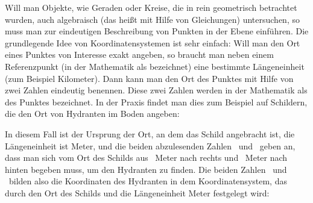 
\Mtikzexternalize




\begin{MSectionStart}

\MModstartBox
\end{MSectionStart}


\begin{MIntro}

Will man Objekte, wie Geraden oder Kreise, die in  rein geometrisch betrachtet wurden, auch algebraisch (das heißt mit Hilfe von Gleichungen) untersuchen, so muss man zur eindeutigen Beschreibung von Punkten in der Ebene  einführen. Die grundlegende Idee von Koordinatensystemen ist sehr einfach: Will man den Ort eines Punktes von Interesse exakt angeben, so braucht man neben einem Referenzpunkt (in der Mathematik als  bezeichnet) eine bestimmte Längeneinheit (zum Beispiel Kilometer). Dann kann man den Ort des Punktes mit Hilfe von zwei Zahlen eindeutig benennen. Diese zwei Zahlen werden in der Mathematik als  des Punktes bezeichnet. In der Praxis findet man dies zum Beispiel auf Schildern, die den Ort von Hydranten im Boden angeben:

\begin{center}
\end{center}

In diesem Fall ist der Ursprung der Ort, an dem das Schild angebracht ist, die Längeneinheit ist Meter, und die beiden abzulesenden Zahlen \ und \ geben an, dass man sich vom Ort des Schilds aus \ Meter nach rechts und \ Meter nach hinten begeben muss, um den Hydranten zu finden. Die beiden Zahlen \ und \ bilden also die Koordinaten des Hydranten in dem Koordinatensystem, das durch den Ort des Schilds und die Längeneinheit Meter festgelegt wird:


\end{MIntro}
